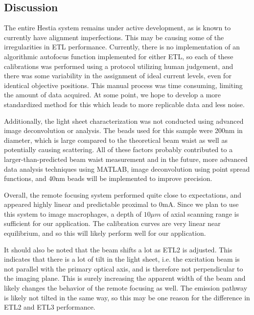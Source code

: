 \subsection{Discussion}
The entire Hestia system remains under active development, as is known to currently have alignment imperfections. This may be causing some of the irregularities in ETL performance. Currently, there is no implementation of an algorithmic autofocus function implemented for either ETL, so each of these calibrations was performed using a protocol utilizing human judgement, and there was some variability in the assignment of ideal current levels, even for identical objective positions. This manual process was time consuming, limiting the amount of data acquired. At some point, we hope to develop a more standardized method for this which leads to more replicable data and less noise. \par
Additionally, the light sheet characterization was not conducted using advanced image deconvolution or analysis. The beads used for this sample were 200nm in diameter, which is large compared to the theoretical beam waist as well as potentially causing scattering. All of these factors probably contributed to a larger-than-predicted beam waist measurement and in the future, more advanced data analysis techniques using MATLAB, image deconvolution using point spread functions, and 40nm beads will be implemented to improve precision.
\par Overall, the remote focusing system performed quite close to expectations, and appeared highly linear and predictable proximal to 0mA. Since we plan to use this system to image macrophages, a depth of $10 \mu m$ of axial scanning range is sufficient for our application. The calibration curves are very linear near equilibrium, and so this will likely perform well for our application.\par
It should also be noted that the beam shifts a lot as ETL2 is adjusted. This indicates that there is a lot of tilt in the light sheet, i.e. the excitation beam is not parallel with the primary optical axis, and is therefore not perpendicular to the imaging plane. This is surely increasing the apparent width of the beam and likely changes the behavior of the remote focusing as well. The emission pathway is likely not tilted in the same way, so this may be one reason for the difference in ETL2 and ETL3 performance.

